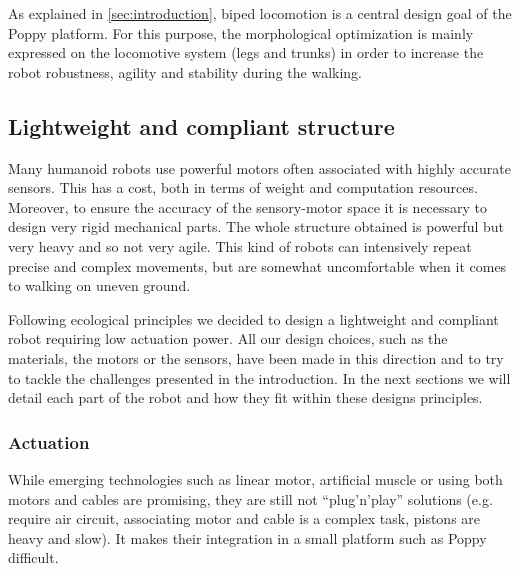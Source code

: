 As explained in \ref{sec:introduction}, biped locomotion is a central design goal of the Poppy platform. For this purpose, the morphological optimization is mainly expressed on the locomotive system (legs and trunks) in order to increase the robot robustness, agility and stability during the walking.


\subsection{Lightweight and compliant structure} %
\label{sub:a_ligthweight_and_compliant_structre}
Many humanoid robots use powerful motors often associated with highly accurate sensors. This has a cost, both in terms of weight and computation resources. Moreover, to ensure the accuracy of the sensory-motor space it is necessary to design very rigid mechanical parts. The whole structure obtained is powerful but very heavy and so not very agile. This kind of robots can intensively repeat precise and complex movements, but are somewhat uncomfortable when it comes to walking on uneven ground.

Following ecological principles \cite{pfeifer2005new} we decided to design a lightweight and compliant robot requiring low actuation power. All our design choices, such as the materials, the motors or the sensors, have been made in this direction and to try to tackle the challenges presented in the introduction. In the next sections we will detail each part of the robot and how they fit within these designs principles.

\subsubsection{Actuation} %
\label{ssub:robot_actuation}

While emerging technologies such as linear motor, artificial muscle or using both motors and cables are promising, they are still not ``plug'n'play'' solutions (e.g. require air circuit, associating motor and cable is a complex task, pistons are heavy and slow). It makes their integration in a small platform such as Poppy difficult.

